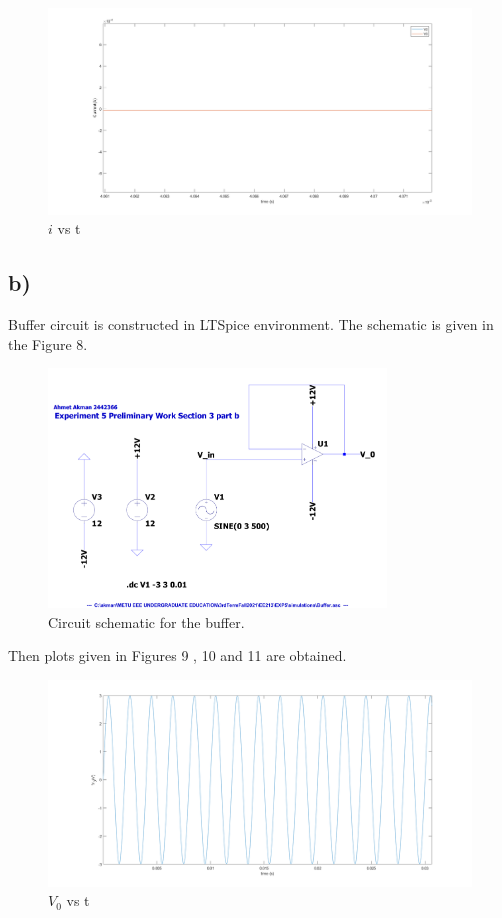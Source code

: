 \documentclass[letterpaper,12pt]{article}
\begin{document}
\begin{figure}[H]
	\centering
   \includegraphics[width=1\textwidth]{3a_i.png}
   \caption{\(i\) vs t}
\end{figure}

\subsection{b)}
Buffer circuit is constructed in LTSpice environment. The schematic is given in the Figure 8.
\begin{figure}[H]
	\centering
   \includegraphics[width=0.8\textwidth]{Buffer_SCH.pdf}
   \caption{Circuit schematic for the buffer.}
\end{figure} 
Then plots given in Figures 9 , 10 and 11 are obtained.
\begin{figure}[H]
	\centering
   \includegraphics[width=1\textwidth]{3b_vs_t.png}
   \caption{\(V_0\) vs t}
\end{figure}
\end{document}
